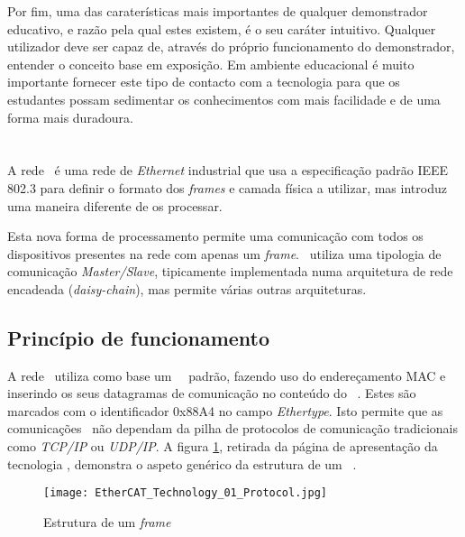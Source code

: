 Por fim, uma das caraterísticas mais importantes de qualquer demonstrador
educativo, e razão pela qual estes existem, é o seu caráter intuitivo.
Qualquer utilizador deve ser capaz de, através do próprio funcionamento
do demonstrador, entender o conceito base em exposição. Em ambiente
educacional é muito importante fornecer este tipo de contacto com a
tecnologia para que os estudantes possam sedimentar os conhecimentos com
mais facilidade e de uma forma mais duradoura. %


\section{\ecat}\label{sec:ethercat}

A rede \ecat\ é uma rede de \emph{Ethernet} industrial que usa a
especificação padrão IEEE 802.3 \cite[]{ieee:IEEEStandardEthernet} para
definir o formato dos \emph{frames} e camada física a utilizar, mas
introduz uma maneira diferente de os processar.

Esta nova forma de processamento permite uma comunicação com todos os
dispositivos presentes na rede com apenas um \emph{frame}. \ecat\ utiliza
uma tipologia de comunicação \emph{Master/Slave}, tipicamente implementada
numa arquitetura de rede encadeada (\emph{daisy-chain}), mas permite várias
outras arquiteturas.

\subsection{Princípio de funcionamento}

A rede \ecat\ utiliza como base um \framee\ \ethernet\ padrão, fazendo
uso do endereçamento MAC e inserindo os seus datagramas de comunicação no
conteúdo do \framee\ \ethernet. Estes são marcados com o identificador
0x88A4 no campo \emph{Ethertype}. Isto permite que as comunicações \ecat\
não dependam da pilha de protocolos de comunicação tradicionais como
\emph{TCP/IP} ou \emph{UDP/IP}. A figura \ref{fig:ecat-frame}, retirada
da página de apresentação da tecnologia \cite[]{group:EtherCAT}, demonstra
o aspeto genérico da estrutura de um \framee\ \ecat.

\begin{figure}[htp]
 \centering
 \texttt{[image: EtherCAT\_Technology\_01\_Protocol.jpg]}
 \caption{Estrutura de um \emph{frame} \ecat}
 \label{fig:ecat-frame}
\end{figure}

